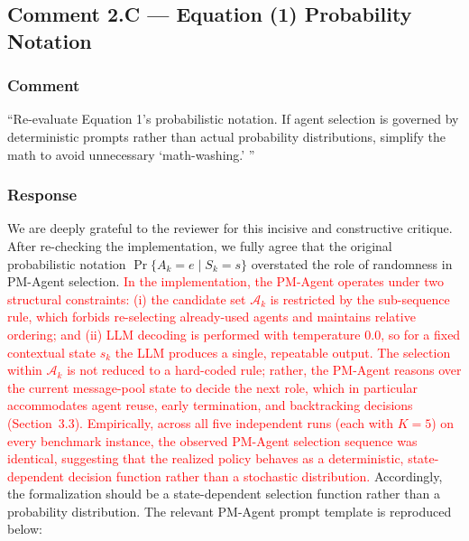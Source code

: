 \documentclass[11pt,a4paper]{article}
\begin{document}
\subsection{Comment 2.C --- Equation (1) Probability Notation}

\subsubsection{Comment}
``Re-evaluate Equation 1's probabilistic notation. If agent selection is governed by deterministic prompts rather than actual probability distributions, simplify the math to avoid unnecessary `math-washing.' ''

\subsubsection{Response}
We are deeply grateful to the reviewer for this incisive and constructive critique. After re-checking the implementation, we fully agree that the original probabilistic notation $\Pr\{A_k=e\mid S_k=s\}$ overstated the role of randomness in PM-Agent selection. \textcolor{red}{In the implementation, the PM-Agent operates under two structural constraints: (i) the candidate set $\mathcal{A}_k$ is restricted by the sub-sequence rule, which forbids re-selecting already-used agents and maintains relative ordering; and (ii) LLM decoding is performed with temperature 0.0, so for a fixed contextual state $s_k$ the LLM produces a single, repeatable output. The selection within $\mathcal{A}_k$ is not reduced to a hard-coded rule; rather, the PM-Agent reasons over the current message-pool state to decide the next role, which in particular accommodates agent reuse, early termination, and backtracking decisions (Section~3.3).} \textcolor{red}{Empirically, across all five independent runs (each with $K{=}5$) on every benchmark instance, the observed PM-Agent selection sequence was identical, suggesting that the realized policy behaves as a deterministic, state-dependent decision function rather than a stochastic distribution.} Accordingly, the formalization should be a state-dependent selection function rather than a probability distribution. The relevant PM-Agent prompt template is reproduced below:
\end{document}
